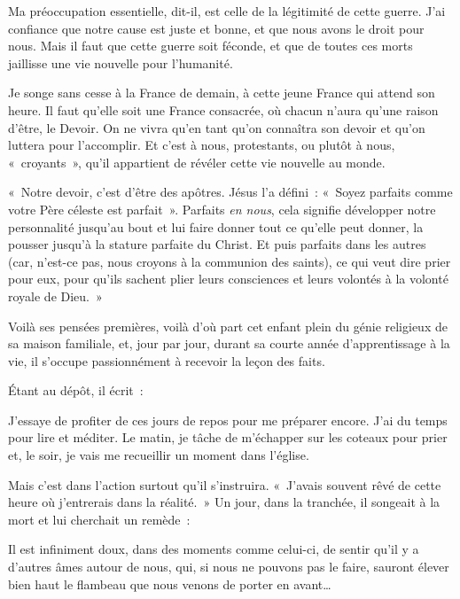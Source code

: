 \documentclass[french,twoside]{book} %
\newenvironment{quoteblock}%
  {\begin{quoting}}
  {\end{quoting}}
\newenvironment{quotebar}{%
    \def\FrameCommand{{\color{rubric!10!}\vrule width 0.5em} \hspace{0.9em}}%
    \def\OuterFrameSep{\itemsep} %
    \MakeFramed {\advance\hsize-\width \FrameRestore}
  }%
  {%
    \endMakeFramed
  }
\renewenvironment{quoteblock}%
  {%
    \savenotes
    \setstretch{0.9}
    \normalfont
    \begin{quotebar}
  }
  {%
    \end{quotebar}
    \spewnotes
  }
\begin{document}
\begin{quoteblock}
 \noindent Ma préoccupation essentielle, dit-il, est celle de la légitimité de cette guerre. J’ai confiance que notre cause est juste et bonne, et que nous avons le droit pour nous. Mais il faut que cette guerre soit féconde, et que de toutes ces morts jaillisse une vie nouvelle pour l’humanité.‌\par
 Je songe sans cesse à la France de demain, à cette jeune France qui attend son heure. Il faut qu’elle soit une France consacrée, où chacun n’aura qu’une raison d’être, le Devoir. On ne vivra qu’en tant qu’on connaîtra son devoir et qu’on luttera pour l’accomplir. Et c’est à nous, protestants, ou plutôt à nous, « croyants », qu’il appartient de révéler cette vie nouvelle au monde.‌\par
 « Notre devoir, c’est d’être des apôtres. Jésus l’a défini : « Soyez parfaits comme votre Père céleste est parfait ». Parfaits {\itshape en nous}, cela signifie développer notre personnalité jusqu’au bout et lui faire donner tout ce qu’elle peut donner, la pousser jusqu’à la stature parfaite du Christ. Et puis parfaits dans les autres (car, n’est-ce pas, nous croyons à la communion des saints), ce qui veut dire prier pour eux, pour qu’ils sachent plier leurs consciences et leurs volontés à la volonté royale de Dieu. »‌
 \end{quoteblock}

\noindent Voilà ses pensées premières, voilà d’où part cet enfant plein du génie religieux de sa maison familiale, et, jour par jour, durant sa courte année d’apprentissage à la vie, il s’occupe passionnément à recevoir la leçon des faits.‌\par
Étant au dépôt, il écrit :‌\par

\begin{quoteblock}
 \noindent J’essaye de profiter de ces jours de repos pour me préparer encore. J’ai du temps pour lire et méditer. Le matin, je tâche de m’échapper sur les coteaux pour prier et, le soir, je vais me recueillir un moment dans l’église.‌
 \end{quoteblock}

\noindent Mais c’est dans l’action surtout qu’il s’instruira. « J’avais souvent rêvé de cette heure où j’entrerais dans la réalité. » Un jour, dans la tranchée, il songeait à la mort et lui cherchait un remède :‌\par

\begin{quoteblock}
 \noindent Il est infiniment doux, dans des moments comme celui-ci, de sentir qu’il y a d’autres âmes autour de nous, qui, si nous ne pouvons pas le faire, sauront élever bien haut le flambeau que nous venons de porter en avant…‌
 \end{quoteblock}
\end{document}
